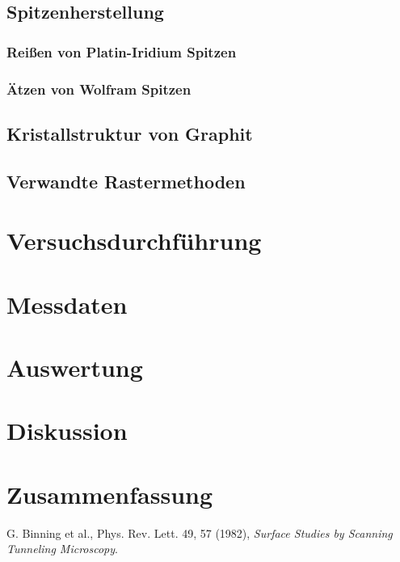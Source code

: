 \documentclass[10pt, a4paper]{article}
\begin{document}
\subsection{Spitzenherstellung}
\subsubsection{Reißen von Platin-Iridium Spitzen}
\subsubsection{Ätzen von Wolfram Spitzen}

\subsection{Kristallstruktur von Graphit}

\subsection{Verwandte Rastermethoden}

\section{Versuchsdurchführung}

\section{Messdaten}

\section{Auswertung}

\section{Diskussion}

\section{Zusammenfassung}


\begin{thebibliography}{9}

  G. Binning et al., Phys. Rev. Lett. 49, 57 (1982),
  \emph{Surface Studies by Scanning Tunneling Microscopy}.
\end{thebibliography}
\end{document}
